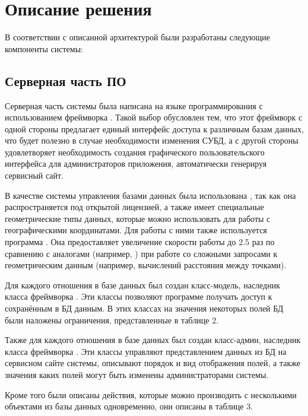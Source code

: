 
\section{Описание решения}

В соответствии с описанной архитектурой были разработаны следующие компоненты системы:

\subsection{Серверная часть ПО}
\label{subsec:serverside-app}

\tab
Серверная часть системы была написана на языке программирования  с использованием фреймворка .
Такой выбор обусловлен тем, что этот фреймворк с одной стороны предлагает единый интерфейс доступа к различным базам данных, что будет полезно в случае необходимости изменения СУБД, а с другой стороны удовлетворяет необходимость создания графического пользовательского интерфейса для администраторов приложения, автоматически генерируя сервисный сайт.

\tab
В качестве системы управления базами данных была использована , так как она распространяется под открытой лицензией, а также имеет специальные геометрические типы данных, которые можно использовать для работы с географическими координатами.
Для работы с ними также используется программа .
Она предоставляет увеличение скорости работы до 2.5 раз по сравнению с аналогами (например, ) при работе со сложными запросами к геометрическим данным (например, вычислений расстояния между точками)\cite{postgis-vs-mongo}.

\tab
Для каждого отношения в базе данных был создан класс-модель, наследник класса  фреймворка .
Эти классы позволяют программе получать доступ к сохранённым в БД данным.
В этих классах на значения некоторых полей БД были наложены ограничения, представленные в таблице 2.
\tabletwo

\tab
Также для каждого отношения в базе данных был создан класс-админ, наследник класса  фреймворка .
Эти классы управляют представлением данных из БД на сервисном сайте системы, описывают порядок и вид отображения полей, а также значения каких полей могут быть изменены администраторами системы.

\tab
Кроме того были описаны действия, которые можно производить с несколькими объектами из базы данных одновременно, они описаны в таблице 3.
\tablethree

